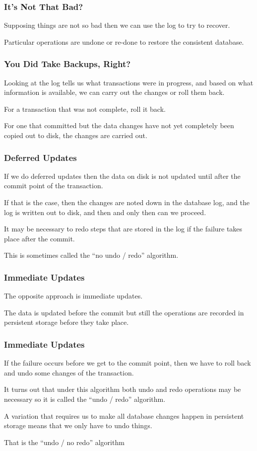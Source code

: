 \begin{frame}
\frametitle{It's Not That Bad?}

Supposing things are not so bad then we can use the log to try to recover. 

Particular operations are undone or re-done to restore the consistent database. 

\end{frame}


\begin{frame}
\frametitle{You Did Take Backups, Right?}

Looking at the log tells us what transactions were in progress, and based on what information is available, we can carry out the changes or roll them back. 

For a transaction that was not complete, roll it back.

 For one that committed but the data changes have not yet completely been copied out to disk, the changes are carried out.


\end{frame}


\begin{frame}
\frametitle{Deferred Updates}

If we do \alert{deferred updates} then the data on disk is not updated until after the commit point of the transaction. 

If that is the case, then the changes are noted down in the database log, and the log is written out to disk, and then and only then can we proceed.

It may be necessary to redo steps that are stored in the log if the failure takes place after the commit. 

This is sometimes called the ``no undo / redo'' algorithm.

\end{frame}

\begin{frame}
\frametitle{Immediate Updates}

The opposite approach is \alert{immediate updates}. 

The data is updated before the commit but still the operations are recorded in persistent storage before they take place. 

\end{frame}

\begin{frame}
\frametitle{Immediate Updates}

If the failure occurs before we get to the commit point, then we have to roll back and undo some changes of the transaction. 

It turns out that under this algorithm both undo and redo operations may be necessary so it is called the ``undo / redo'' algorithm. 

A variation that requires us to make all database changes happen in persistent storage means that we only have to undo things.

That is the ``undo / no redo'' algorithm


\end{frame}


